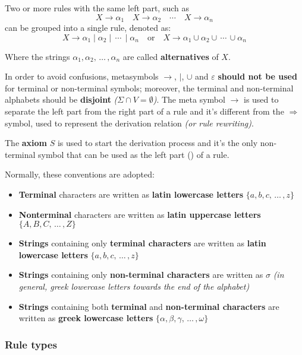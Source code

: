 \documentclass[english]{article}
\begin{document}
Two or more rules with the same left part, such as
\[ X \rightarrow \alpha_1 \quad X \rightarrow \alpha_2\quad \cdots \quad X \rightarrow \alpha_n \]
can be grouped into a single rule, denoted as:
\[ X \rightarrow \alpha_1 \mid \alpha_2 \mid \,\cdots\, \mid \alpha_n \quad \text{or} \quad X \rightarrow \alpha_1 \cup \alpha_2 \cup \,\cdots\, \cup \alpha_n \]

Where the strings \(\alpha_1, \alpha_2, \,\ldots\,, \alpha_n\) are called \textbf{alternatives} of \(X\).

In order to avoid confusions, metasymbols \(\rightarrow\), \(|\), \(\cup\) and \(\varepsilon\) \textbf{should not be used} for terminal or non-terminal symbols;
moreover, the terminal and non-terminal alphabets should be \textbf{disjoint} \textit{(\(\Sigma \cap V = \emptyset\))}.
The meta symbol \(\rightarrow\) is used to separate the left part from the right part of a rule and it's different from the \(\Rightarrow\) symbol, used to represent the derivation relation \textit{(or rule rewriting)}.

The \textbf{axiom} \(S\) is used to start the derivation process and it's the only non-terminal symbol that can be used as the left part (\LP) of a rule.

\bigskip
Normally, these conventions are adopted:

\begin{itemize}
  \item \textbf{Terminal} characters are written as \textbf{latin lowercase letters} \(\{a, b, c, \,\ldots\, , z\}\)
  \item \textbf{Nonterminal} characters are written as \textbf{latin uppercase letters} \(\{A, B, C, \,\ldots\, , Z\}\)
  \item \textbf{Strings} containing only \textbf{terminal characters} are written as \textbf{latin lowercase letters} \(\{a, b, c, \,\ldots\, , z\}\)
  \item \textbf{Strings} containing only \textbf{non-terminal characters} are written as \(\sigma\) \textit{(in general, greek lowercase letters towards the end of the alphabet)}
  \item \textbf{Strings} containing both \textbf{terminal} and \textbf{non-terminal characters} are written as \textbf{greek lowercase letters} \(\{\alpha, \beta, \gamma, \,\ldots\, , \omega\}\)
\end{itemize}

\subsubsection{Rule types}
\end{document}
